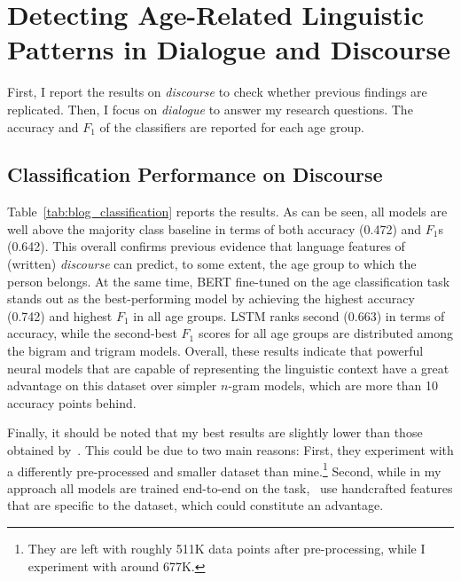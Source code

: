 \section{Detecting Age-Related Linguistic Patterns in Dialogue and Discourse}
\label{sec:exp1_results}

First, I report the results on \emph{discourse}
to check whether previous findings \citep{schler2006effects} are replicated. Then, I focus on \emph{dialogue} to answer my research questions. The accuracy and $F_1$ of the classifiers are reported for each age group.

\subsection{Classification Performance on Discourse}
Table~\ref{tab:blog_classification} reports the results.
As can be seen,
all models are well above the majority class baseline in terms of both accuracy (0.472) and 
$F_1$s (0.642). This overall confirms previous evidence \citep{schler2006effects} that language features of (written) \emph{discourse} can predict, to some extent, the age group to which the person
belongs. At the same time, BERT fine-tuned on the age classification task stands out as the best-performing model by achieving the highest accuracy (0.742) and highest $F_1$ in all age groups.
LSTM ranks  second (0.663) in terms of accuracy, while the second-best $F_1$ scores for all age groups are distributed among the bigram and trigram models.
Overall, these results indicate that powerful neural models that are capable of representing the linguistic context %
have a great advantage on this dataset over simpler $n$-gram models, which are more than 10 accuracy points behind. 

Finally, it should be noted that my best results are slightly lower than those obtained by~\citet{schler2006effects}. This could be due to two main reasons: First, they experiment with a
differently pre-processed and smaller
dataset than mine.\footnote{They are left with roughly 511K data points after pre-processing, 
while I experiment with around 677K.}
Second, while in my approach all models are trained end-to-end on the task,~\citet{schler2006effects} use
handcrafted features that are specific to the dataset, 
which could constitute an advantage.

